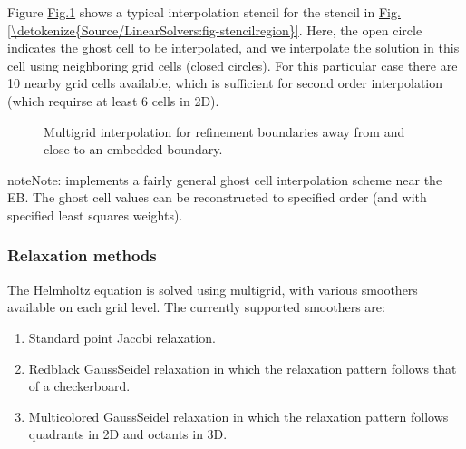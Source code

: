 \documentclass[letterpaper,10pt,english]{sphinxmanual}
\let\sphinxpxdimen\pdfpxdimen\else\newdimen\sphinxpxdimen
\begin{document}
\sphinxAtStartPar
Figure \hyperref[\detokenize{Source/LinearSolvers:fig-ebmultigridinterpolation}]{Fig.\@ \ref{\detokenize{Source/LinearSolvers:fig-ebmultigridinterpolation}}} shows a typical interpolation stencil for the stencil in \hyperref[\detokenize{Source/LinearSolvers:fig-stencilregion}]{Fig.\@ \ref{\detokenize{Source/LinearSolvers:fig-stencilregion}}}.
Here, the open circle indicates the ghost cell to be interpolated, and we interpolate the solution in this cell using neighboring grid cells (closed circles).
For this particular case there are 10 nearby grid cells available, which is sufficient for second order interpolation (which requirse at least 6 cells in 2D).

\begin{figure}[htb]
\centering
\capstart

\noindent\sphinxincludegraphics[width=360\sphinxpxdimen]{{EBMultigridInterpolation}.png}
\caption{Multigrid interpolation for refinement boundaries away from and close to an embedded boundary.}\label{\detokenize{Source/LinearSolvers:id5}}\label{\detokenize{Source/LinearSolvers:fig-ebmultigridinterpolation}}\end{figure}

\begin{sphinxadmonition}{note}{Note:}
\sphinxAtStartPar
{} implements a fairly general ghost cell interpolation scheme near the EB. The ghost cell values can be reconstructed to specified order (and with specified least squares weights).
\end{sphinxadmonition}


\subsubsection{Relaxation methods}
\label{\detokenize{Source/LinearSolvers:relaxation-methods}}
\sphinxAtStartPar
The Helmholtz equation is solved using multigrid, with various smoothers available on each grid level.
The currently supported smoothers are:
\begin{enumerate}
%
\item {} 
\sphinxAtStartPar
Standard point Jacobi relaxation.

\item {} 
\sphinxAtStartPar
Red\sphinxhyphen{}black Gauss\sphinxhyphen{}Seidel relaxation in which the relaxation pattern follows that of a checkerboard.

\item {} 
\sphinxAtStartPar
Multi\sphinxhyphen{}colored Gauss\sphinxhyphen{}Seidel relaxation in which the relaxation pattern follows quadrants in 2D and octants in 3D.

\end{enumerate}
\end{document}
